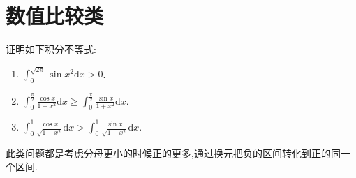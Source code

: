 \documentclass[../../main.tex]{subfiles}
\begin{document}
\section{数值比较类}

\begin{example}
证明如下积分不等式:
\begin{enumerate}
\item $\int_{0}^{\sqrt{2\pi}} \sin x^{2}\mathrm{d}x > 0$.

\item $\int_{0}^{\frac{\pi}{2}} \frac{\cos x}{1 + x^{2}}\mathrm{d}x \geqslant \int_{0}^{\frac{\pi}{2}} \frac{\sin x}{1 + x^{2}}\mathrm{d}x.$

\item $\int_{0}^{1} \frac{\cos x}{\sqrt{1 - x^{2}}}\mathrm{d}x > \int_{0}^{1} \frac{\sin x}{\sqrt{1 - x^{2}}}\mathrm{d}x.$
\end{enumerate}
\end{example}
\begin{note}
此类问题都是考虑分母更小的时候正的更多,通过换元把负的区间转化到正的同一个区间.
\end{note}
\end{document}
